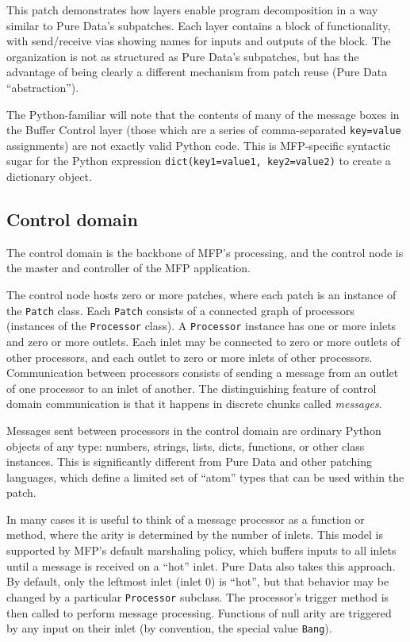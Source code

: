 \documentclass[11pt,a4paper]{article}
\begin{document}
This patch demonstrates how layers enable program decomposition in a 
way similar to Pure Data's subpatches.  Each layer contains a block of
functionality, with send/receive vias showing names for inputs and outputs
of the block.  The organization is not as structured as Pure Data's
subpatches, but has the advantage of being clearly a different mechanism
from patch reuse (Pure Data ``abstraction'').

The Python-familiar will note that the contents of many of the message
boxes in the Buffer Control layer (those which are a series of
comma-separated \texttt{key=value} assignments) are not exactly valid
Python code.  This is MFP-specific syntactic sugar for the Python
expression \texttt{dict(key1=value1, key2=value2)} to create a dictionary
object.

\subsection{Control domain}

The control domain is the backbone of MFP's processing, and the control
node is the master and controller of the MFP application.   

The control node hosts zero or more patches, where each patch is an
instance of the \texttt{Patch} class.  Each \texttt{Patch} consists of a
connected graph of processors (instances of the \texttt{Processor} class).
A \texttt{Processor} instance has one or more inlets and zero or more
outlets.  Each inlet may be connected to zero or more outlets of other
processors, and each outlet to zero or more inlets of other processors.
Communication between processors consists of sending a message from an
outlet of one processor to an inlet of another.  The distinguishing feature
of control domain communication is that it happens in discrete chunks
called \emph{messages}. 

Messages sent between processors in the control domain are ordinary Python
objects of any type: numbers, strings, lists, dicts, functions, or other
class instances.  This is significantly different from Pure Data and other
patching languages, which define a limited set of ``atom'' types that can be
used within the patch.   

In many cases it is useful to think of a message processor as a function or
method, where the arity is determined by the number of inlets.  This model
is supported by MFP's default marshaling policy, which buffers inputs to
all inlets until a message is received on a ``hot'' inlet.  Pure Data also
takes this approach.  By  default, only the leftmost inlet (inlet 0) is
``hot'', but that behavior may be changed by a particular
\texttt{Processor} subclass.  The processor's trigger method is then called
to perform message processing.  Functions of null arity are triggered by
any input on their inlet (by convention, the special value \texttt{Bang}).
\end{document}
